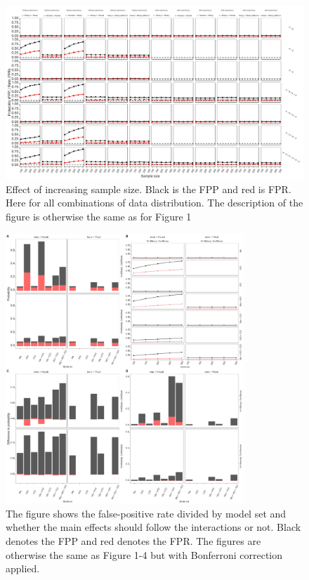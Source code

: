 \begin{figure}[ht]
\includegraphics{R/Analysis/Result/Figures/Figure1DSI.jpeg}
\centering
\caption{Effect of increasing sample size. Black is the FPP and red is FPR.  Here for all combinations of data distribution. The description of the figure is otherwise the same as for Figure 1}
\label{fig:mainfigure}
\end{figure}

\begin{figure}[ht]
\includegraphics[width=0.8\textwidth]{R/Analysis/Result/Figures/Figure1BF.jpeg}
\centering
\caption{The figure shows the false-positive rate divided by model set and whether the main effects should follow the interactions or not. Black denotes the FPP and red denotes the FPR. The figures are otherwise the same as Figure 1-4 but with Bonferroni correction applied.}
\label{fig:mainfigure}
\end{figure}
